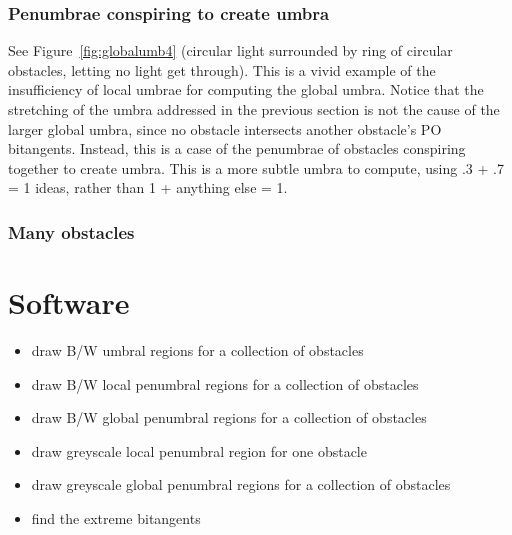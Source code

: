 \documentclass[12pt]{article}
\begin{document}
\subsubsection{Penumbrae conspiring to create umbra}

See Figure~\ref{fig:globalumb4} (circular light surrounded by ring
of circular obstacles, letting no light get through).
This is a vivid example of the insufficiency of local umbrae for computing
the global umbra.
Notice that the stretching of the umbra addressed in the previous section
is not the cause of the larger global umbra, since no obstacle intersects
another obstacle's PO bitangents.
Instead, this is a case of the penumbrae of obstacles conspiring together
to create umbra.
This is a more subtle umbra to compute, using .3 + .7 = 1 ideas,
rather than 1 + anything else = 1.

\clearpage


\subsubsection{Many obstacles}

\begin{defn2}

\end{defn2}


\clearpage

\section{Software}

\begin{itemize}
\item draw B/W umbral regions for a collection of obstacles
\item draw B/W local penumbral regions for a collection of obstacles
\item draw B/W global penumbral regions for a collection of obstacles 
\item draw greyscale local penumbral region for one obstacle
\item draw greyscale global penumbral regions for a collection of obstacles
\item find the extreme bitangents
\end{itemize}
\end{document}
